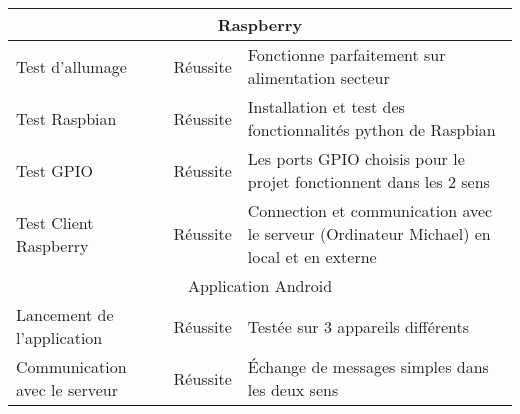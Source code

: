 \begin{tabular}{|p{}  |m{}  |p{} |}	
\hline
\multicolumn{3}{|c|}{Raspberry}\\ \hline
Test d'allumage & Réussite & Fonctionne parfaitement sur alimentation secteur \\
\hline
Test Raspbian & Réussite & Installation et test des fonctionnalités python de Raspbian \\ 
\hline
Test GPIO & Réussite & Les ports GPIO choisis pour le projet fonctionnent dans les 2 sens \\
\hline
Test Client Raspberry & Réussite & Connection et communication avec le serveur (Ordinateur Michael) en local et en externe \\
\hline
\multicolumn{3}{|c|}{Application Android}\\ \hline
Lancement de l'application & Réussite & Testée sur 3 appareils différents \\
\hline
Communication avec le serveur & Réussite & Échange de messages simples dans les deux sens \\
\hline

\end{tabular}